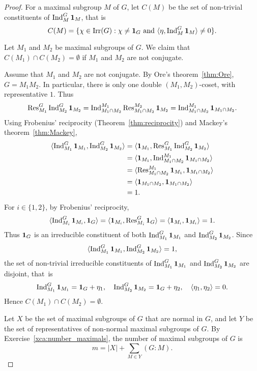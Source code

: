 \begin{proof}
    For a maximal subgroup $M$ of $G$, let 
    $C(M)$ be the set of non-trivial constituents
    of $\operatorname{Ind}_M^G\mathbf{1}_M$, that is
    \[
    C(M)=\{\chi\in\operatorname{Irr}(G):\chi\ne\mathbf{1}_G\text{ and }\langle\eta,\operatorname{Ind}_M^G\mathbf{1}_M\rangle\ne0\}.
    \]

    Let $M_1$ and $M_2$ be maximal subgroups of $G$. 
    We claim that $C(M_1)\cap C(M_2)=\emptyset$ if $M_1$ and $M_2$ are
    not conjugate. 
    
    Assume that $M_1$ and $M_2$ are not conjugate. By  
    Ore's theorem~\ref{thm:Ore}, $G=M_1M_2$. In particular, 
    there is only one double $(M_1,M_2)$-coset, with representative $1$. Thus
    \[
    \operatorname{Res}_{M_1}^G\operatorname{Ind}_{M_2}^G\mathbf{1}_{M_2}=\operatorname{Ind}_{M_1\cap M_2}^{M_1}\operatorname{Res}_{M_1\cap M_2}^{M_2}\mathbf{1}_{M_2}
    =\operatorname{Ind}_{M_1\cap M_2}^{M_1}\mathbf{1}_{M_1\cap M_2}.
    \]
    Using Frobenius' reciprocity (Theorem~\ref{thm:reciprocity}) and 
    Mackey's theorem~\ref{thm:Mackey}, 
    \begin{align*}
    \langle\operatorname{Ind}_{M_1}^G\mathbf{1}_{M_1},\operatorname{Ind}_{M_2}^G\mathbf{1}_{M_2}\rangle
    &=\langle \mathbf{1}_{M_1},\operatorname{Res}_{M_1}^G\operatorname{Ind}_{M_2}^G\mathbf{1}_{M_2}\rangle\\
    &=\langle \mathbf{1}_{M_1},\operatorname{Ind}_{M_1\cap M_2}^{M_1}\mathbf{1}_{M_1\cap M_2}\rangle\\
    &=\langle \operatorname{Res}_{M_1\cap M_2}^{M_1}\mathbf{1}_{M_1},\mathbf{1}_{M_1\cap M_2}\rangle\\
    &=\langle \mathbf{1}_{M_1\cap M_2},\mathbf{1}_{M_1\cap M_2}\rangle\\
    &=1.
    \end{align*}
    For $i\in\{1,2\}$, by Frobenius' reciprocity, 
    \[
    \langle\operatorname{Ind}_{M_i}^G\mathbf{1}_{M_i},\mathbf{1}_G\rangle
    =\langle\mathbf{1}_{M_i},\operatorname{Res}_{M_i}^G\mathbf{1}_G\rangle=\langle \mathbf{1}_{M_i},\mathbf{1}_{M_i}\rangle=1.
    \]
    Thus $\mathbf{1}_{G}$ is an irreducible constituent of both 
    $\operatorname{Ind}_{M_1}^G\mathbf{1}_{M_1}$ and $\operatorname{Ind}_{M_2}^G\mathbf{1}_{M_2}$. Since 
    \[
    \langle\operatorname{Ind}_{M_1}^G\mathbf{1}_{M_1},\operatorname{Ind}_{M_2}^G\mathbf{1}_{M_2}\rangle=1,
    \]
    the set of non-trivial 
    irreducible
    constituents of $\operatorname{Ind}_{M_1}^G\mathbf{1}_{M_1}$ and $\operatorname{Ind}_{M_2}^G\mathbf{1}_{M_2}$ are disjoint, that~is  
    \[
    \operatorname{Ind}_{M_1}^G\mathbf{1}_{M_1}=\mathbf{1}_G+\eta_1,
    \quad 
    \operatorname{Ind}_{M_2}^G\mathbf{1}_{M_2}=\mathbf{1}_G+\eta_2,
    \quad 
    \langle\eta_1,\eta_2\rangle=0.
    \]
    Hence $C(M_1)\cap C(M_2)=\emptyset$. 

    
   Let $X$ be the set of maximal subgroups of $G$ that are normal in $G$, and 
   let $Y$ be the set of representatives of non-normal 
   maximal subgroups of $G$. By Exercise~\ref{xca:number_maximals}, 
   the number of 
   maximal subgroups of $G$ is 
   \[
   m=|X|+\sum_{M\in Y}(G:M).
   \]


\end{proof}
